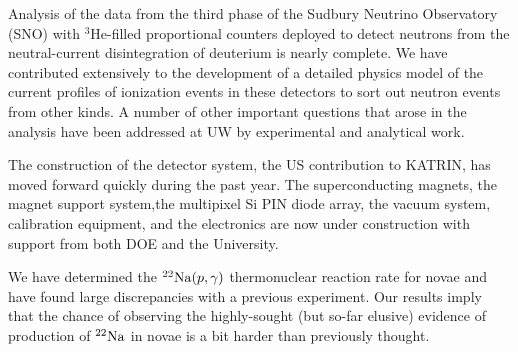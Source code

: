 

\item Analysis of the data from the third phase of the Sudbury Neutrino Observatory (SNO) with $^3$He-filled proportional counters deployed to detect neutrons from the neutral-current disintegration of deuterium is nearly complete.  We have contributed extensively to the development of a detailed physics model of the current profiles of ionization events in these detectors to sort out neutron events from other kinds.  A number of other important questions that arose in the analysis have been addressed at UW by experimental and analytical work.  

\item The construction of the detector system, the US contribution to KATRIN, has moved forward quickly during the past year.  The superconducting magnets, the magnet support system,the multipixel Si PIN diode array, the vacuum system,  calibration equipment, and the electronics are now under construction with support from both DOE and the University.

\item We have determined the $^{22}{\rm Na}(p,\gamma)$ thermonuclear reaction rate for novae and have found large discrepancies with a previous experiment. Our results imply that the chance of observing the highly-sought (but so-far elusive) evidence of production of $^{22}{\rm Na}$ in novae is a bit harder than previously thought. 
